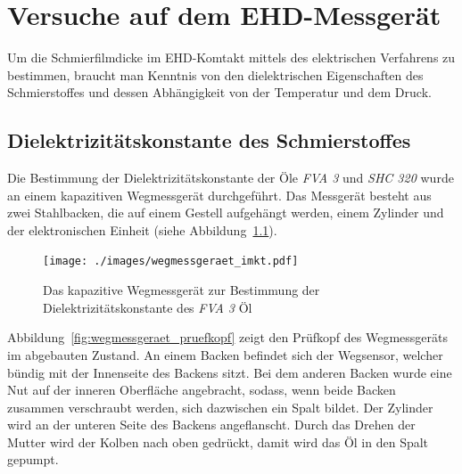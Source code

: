 \chapter{Versuche auf dem EHD-Messgerät}
\label{chap:versuche_auf_dem_ehd_messgeraet}

Um die Schmierfilmdicke im EHD-Komtakt mittels des elektrischen Verfahrens zu bestimmen, braucht man Kenntnis von den dielektrischen Eigenschaften des Schmierstoffes und dessen Abhängigkeit von der Temperatur und dem Druck.

\section{Dielektrizitätskonstante des Schmierstoffes}
\label{sec:dielektrizitaetskonstate_des_schmierstoffes}

Die Bestimmung der Dielektrizitätskonstante der Öle \textit{FVA 3} und \textit{SHC 320} wurde an einem kapazitiven Wegmessgerät durchgeführt.
Das Messgerät besteht aus zwei Stahlbacken, die auf einem Gestell aufgehängt werden, einem Zylinder und der elektronischen Einheit (siehe Abbildung~\ref{fig:das_kapazitive_wegmessgeraet}).

\begin{figure}[htb]
    \centering
    \texttt{[image: ./images/wegmessgeraet\_imkt.pdf]}
    \caption{Das kapazitive Wegmessgerät zur Bestimmung der Dielektrizitätskonstante des \textit{FVA 3} Öl}
    \label{fig:das_kapazitive_wegmessgeraet}
\end{figure}

Abbildung~\ref{fig:wegmessgeraet_pruefkopf} zeigt den Prüfkopf des Wegmessgeräts im abgebauten Zustand.
An einem Backen befindet sich der Wegsensor, welcher bündig mit der Innenseite des Backens sitzt.
Bei dem anderen Backen wurde eine Nut auf der inneren Oberfläche angebracht, sodass, wenn beide Backen zusammen verschraubt werden, sich dazwischen ein Spalt bildet.
Der Zylinder wird an der unteren Seite des Backens angeflanscht.
Durch das Drehen der Mutter wird der Kolben nach oben gedrückt, damit wird das Öl in den Spalt gepumpt.

